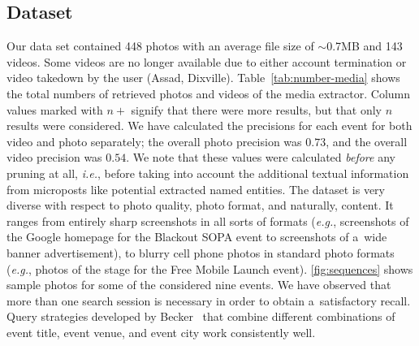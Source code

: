 \subsection{Dataset}
Our data set contained 448 photos with an average file size of
$\sim$0.7MB and 143 videos.
Some videos are no longer available due to either
account termination or video takedown by the user
(Assad, Dixville).
Table~\ref{tab:number-media}  shows the total
numbers of retrieved photos and videos of the media extractor.
Column values marked with $n+$ signify that there were more 
results, but that only $n$ results were considered. 
We have calculated the precisions for each event for both video 
and photo separately; the overall photo precision was $0.73$,
and the overall video precision was $0.54$.
We note that these values were calculated \emph{before}
any pruning at all, \emph{i.e.}, before taking into account
the additional textual information from microposts like
potential extracted named entities.
The dataset is very diverse with respect to photo quality,
photo format, and naturally, content.
It ranges from entirely sharp screenshots
in all sorts of formats (\emph{e.g.},
screenshots of the Google homepage for the Blackout SOPA event
to screenshots of a~wide banner advertisement),
to blurry cell phone photos in standard photo formats
(\emph{e.g.}, photos of the stage
for the Free Mobile Launch event).
\autoref{fig:sequences} shows sample photos for
some of the considered nine events.
We have observed that more than one search session is necessary
in order to obtain a~satisfactory recall.
Query strategies developed by Becker~\cite{becker2012plannedevents}
that combine different combinations of event title,
event venue, and event city work consistently well.

